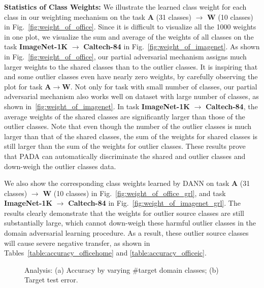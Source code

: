 \documentclass[runningheads]{llncs}
\begin{document}
\textbf{Statistics of Class Weights:} We illustrate the learned class weight for each class in our weighting mechanism on the task \textbf{A} (31 classes) $\rightarrow$ \textbf{W} (10 classes) in Fig.~\ref{fig:weight_of_office}. Since it is difficult to visualize all the 1000 weights in one plot, we visualize the sum and average of the weights of all classes on the task \textbf{ImageNet-1K} $\rightarrow$ \textbf{Caltech-84} in Fig.~\ref{fig:weight_of_imagenet}. As shown in Fig.~\ref{fig:weight_of_office}, our partial adversarial mechanism assigns much larger weights to the shared classes than to the outlier classes. It is inspiring that and some outlier classes even have nearly zero weights, by carefully observing the plot for task \textbf{A}$\rightarrow$\textbf{W}. Not only for task with small number of classes, our partial adversarial mechanism also works well on dataset with large number of classes, as shown in~\ref{fig:weight_of_imagenet}. In task \textbf{ImageNet-1K} $\rightarrow$ \textbf{Caltech-84}, the average weights of the shared classes are significantly larger than those of the outlier classes. Note that even though the number of the outlier classes is much larger than that of the shared classes, the sum of the weights for shared classes is still larger than the sum of the weights for outlier classes. These results prove that PADA can automatically discriminate the shared and outlier classes and down-weigh the outlier classes data. 

We also show the corresponding class weights learned by DANN on task \textbf{A} (31 classes) $\rightarrow$ \textbf{W} (10 classes) in Fig.~\ref{fig:weight_of_office_grl}, and task \textbf{ImageNet-1K} $\rightarrow$ \textbf{Caltech-84} in Fig.~\ref{fig:weight_of_imagenet_grl}. The results clearly demonstrate that the weights for outlier source classes are still substantially large, which cannot down-weigh these harmful outlier classes in the domain adversarial learning procedure. As a result, these outlier source classes will cause severe negative transfer, as shown in Tables~\ref{table:accuracy_officehome} and \ref{table:accuracy_officeic}.

\begin{figure}[!htbp]
  \centering
  \hfil
  \caption{Analysis: (a) Accuracy by varying \#target domain classes; (b) Target test error.}
\end{figure}
\end{document}
